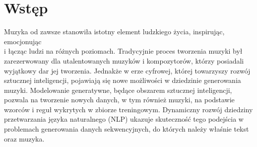 \documentclass[data-science]{agh-wi} %
\begin{document}
\tableofcontents   %
\newpage
\listoffigures     %
\listoftables      %
\mainmatter %
\chapter{Wstęp}
Muzyka od zawsze stanowiła istotny element ludzkiego życia, inspirując, emocjonując \\i łącząc ludzi na różnych poziomach. Tradycyjnie proces tworzenia muzyki był zarezerwowany dla utalentowanych muzyków i kompozytorów, którzy posiadali wyjątkowy dar jej tworzenia. Jednakże w erze cyfrowej, której towarzyszy rozwój sztucznej inteligencji, pojawiają się nowe możliwości w dziedzinie generowania muzyki. Modelowanie generatywne, będące obszarem sztucznej inteligencji, pozwala na tworzenie nowych danych, w tym również muzyki, na podstawie wzorców i reguł wykrytych w zbiorze treningowym. Dynamiczny rozwój dziedziny przetwarzania języka naturalnego (NLP) ukazuje skuteczność tego podejścia w problemach generowania danych sekwencyjnych, do których należy właśnie tekst oraz muzyka.
\end{document}
